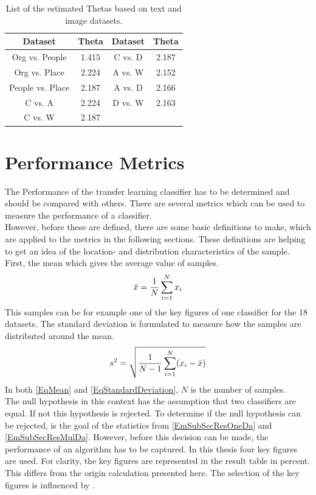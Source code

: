 \begin{table}[]
	\centering
		\begin{tabular}{|c|c||c|c|}
			\hline
			Dataset         & Theta & Dataset & Theta \\ \hline
			Org vs. People   & 1.415 & C vs. D  & 2.187 \\ \hline
			Org vs. Place    & 2.224 & A vs. W  & 2.152\\ \hline
			People vs. Place & 2.187 & A vs. D  & 2.166\\ \hline
			C vs. A          & 2.224 & D vs. W  & 2.163 \\ \hline
			C vs. W          & 2.187\\ \cline{1-2}
	\end{tabular}
	\caption[List of estimated Thetas]{List of the estimated Thetas based on text and image datasets.\label{TableThetaEst}}
\end{table}

\section{Performance Metrics}\label{EmSubSecPerMet}
The Performance of the transfer learning classifier has to be determined and should be compared with others.
There are several metrics which can be used to measure the performance of a classifier.\\
However, before these are defined, there are some basic definitions to make, which are applied to the metrics in the following sections.
These definitions are helping to get an idea of the location- and distribution characteristics of the sample.\cite[p. 216-217]{Teschl.2014}
First, the mean which gives the average value of samples. 
\begin{equation}\label{EqMean}
	\bar{x} = \frac{1}{N}\sum_{i=1}^{N}x_i
\end{equation}
This samples can be for example one of the key figures of one classifier for the 18 datasets. 
The standard deviation is formulated to measure how the samples are distributed around the mean.
\begin{equation}\label{EqStandardDeviation}
s^2=\sqrt{\frac{1}{N-1}\sum_{i=1}^{N}(x_i-\bar{x})}
\end{equation}
In both \eqref{EqMean} and \eqref{EqStandardDeviation}, $N$ is the number of samples. \\
The null hypothesis in this context has the assumption that two classifiers are equal.
If not this hypothesis is rejected.\cite{Alpaydm.1999} 
To determine if the null hypothesis can be rejected, is the goal of the statistics from \ref{EmSubSecResOneDa} and \ref{EmSubSecResMulDa}.
However, before this decision can be made, the performance of an algorithm has to be captured.
In this thesis four key figures are used.
For clarity, the key figures are represented in the result table in percent.
This differs from the origin calculation presented here.
The selection of the key figures is influenced by \cite{Chen.2009}.\\

